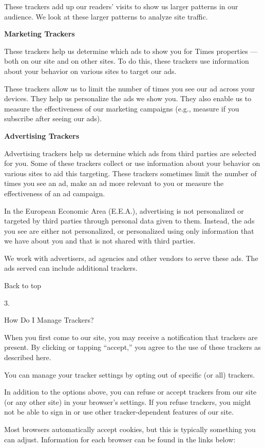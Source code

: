These trackers add up our readers' visits to show us larger patterns in
our audience. We look at these larger patterns to analyze site traffic.

\textbf{Marketing Trackers}

These trackers help us determine which ads to show you for Times
properties --- both on our site and on other sites. To do this, these
trackers use information about your behavior on various sites to target
our ads.

These trackers allow us to limit the number of times you see our ad
across your devices. They help us personalize the ads we show you. They
also enable us to measure the effectiveness of our marketing campaigns
(e.g., measure if you subscribe after seeing our ads).

\textbf{Advertising Trackers}

Advertising trackers help us determine which ads from third parties are
selected for you. Some of these trackers collect or use information
about your behavior on various sites to aid this targeting. These
trackers sometimes limit the number of times you see an ad, make an ad
more relevant to you or measure the effectiveness of an ad campaign.

In the European Economic Area (E.E.A.), advertising is not personalized
or targeted by third parties through personal data given to them.
Instead, the ads you see are either not personalized, or personalized
using only information that we have about you and that is not shared
with third parties.

We work with advertisers, ad agencies and other vendors to serve these
ads. The ads served can include additional trackers.

Back to top

3.

How Do I Manage Trackers?

When you first come to our site, you may receive a notification that
trackers are present. By clicking or tapping ``accept,'' you agree to
the use of these trackers as described here.

You can manage your tracker settings by opting out of specific (or all)
trackers.

In addition to the options above, you can refuse or accept trackers from
our site (or any other site) in your browser's settings. If you refuse
trackers, you might not be able to sign in or use other
tracker-dependent features of our site.

Most browsers automatically accept cookies, but this is typically
something you can adjust. Information for each browser can be found in
the links below:

